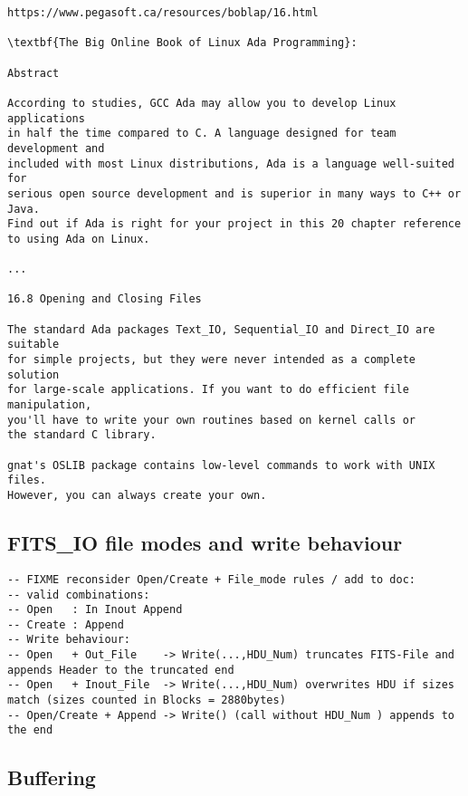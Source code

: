 \documentclass[a4paper,10pt]{article}
\begin{document}
\begin{Verbatim}
https://www.pegasoft.ca/resources/boblap/16.html

\textbf{The Big Online Book of Linux Ada Programming}:

Abstract

According to studies, GCC Ada may allow you to develop Linux applications 
in half the time compared to C. A language designed for team development and 
included with most Linux distributions, Ada is a language well-suited for 
serious open source development and is superior in many ways to C++ or Java. 
Find out if Ada is right for your project in this 20 chapter reference 
to using Ada on Linux.

...

16.8 Opening and Closing Files

The standard Ada packages Text_IO, Sequential_IO and Direct_IO are suitable 
for simple projects, but they were never intended as a complete solution 
for large-scale applications. If you want to do efficient file manipulation, 
you'll have to write your own routines based on kernel calls or 
the standard C library.

gnat's OSLIB package contains low-level commands to work with UNIX files. 
However, you can always create your own.

\end{Verbatim}



\subsection{FITS\_IO file modes and write behaviour}

\begin{verbatim}
-- FIXME reconsider Open/Create + File_mode rules / add to doc:
-- valid combinations:
-- Open   : In Inout Append
-- Create : Append
-- Write behaviour:
-- Open   + Out_File    -> Write(...,HDU_Num) truncates FITS-File and appends Header to the truncated end
-- Open   + Inout_File  -> Write(...,HDU_Num) overwrites HDU if sizes match (sizes counted in Blocks = 2880bytes)
-- Open/Create + Append -> Write() (call without HDU_Num ) appends to the end
\end{verbatim}

\subsection{Buffering}
\label{sec:webbrowser}
\end{document}
